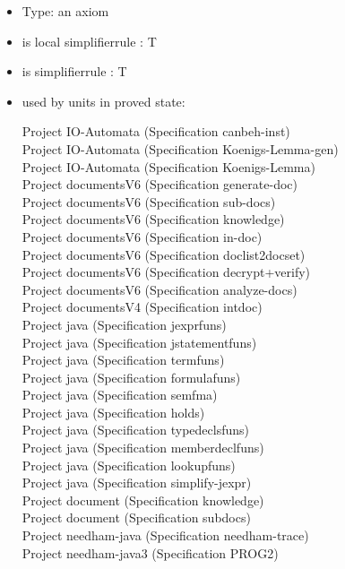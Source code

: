 \documentclass[a4paper]{article}
\begin{document}
\begin{itemize}

\item Type: an axiom

\item is local simplifierrule : T
\item is simplifierrule : T
\item used by units in proved state:

Project IO-Automata (Specification canbeh-inst) \\
Project IO-Automata (Specification Koenigs-Lemma-gen) \\
Project IO-Automata (Specification Koenigs-Lemma) \\
Project documentsV6 (Specification generate-doc) \\
Project documentsV6 (Specification sub-docs) \\
Project documentsV6 (Specification knowledge) \\
Project documentsV6 (Specification in-doc) \\
Project documentsV6 (Specification doclist2docset) \\
Project documentsV6 (Specification decrypt+verify) \\
Project documentsV6 (Specification analyze-docs) \\
Project documentsV4 (Specification intdoc) \\
Project java (Specification jexprfuns) \\
Project java (Specification jstatementfuns) \\
Project java (Specification termfuns) \\
Project java (Specification formulafuns) \\
Project java (Specification semfma) \\
Project java (Specification holds) \\
Project java (Specification typedeclsfuns) \\
Project java (Specification memberdeclfuns) \\
Project java (Specification lookupfuns) \\
Project java (Specification simplify-jexpr) \\
Project document (Specification knowledge) \\
Project document (Specification subdocs) \\
Project needham-java (Specification needham-trace) \\
Project needham-java3 (Specification PROG2) \\

\end{itemize}
\end{document}
